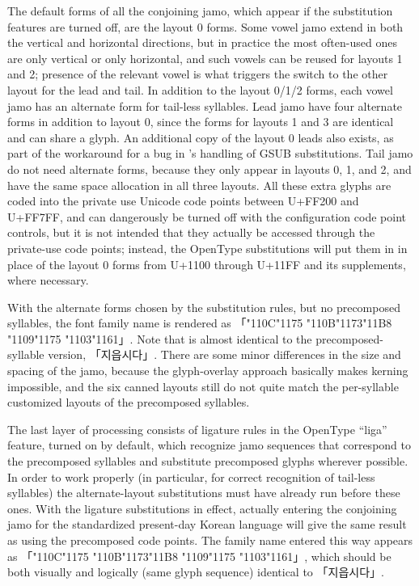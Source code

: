 \documentclass[14pt]{extarticle}
\begin{document}
The default forms of all the conjoining jamo, which appear if the
substitution features are turned off, are the layout 0 forms.  Some vowel
jamo extend in both the vertical and horizontal directions, but in practice
the most often-used ones are only vertical or only horizontal, and such
vowels can be reused for layouts 1 and 2; presence of the relevant vowel is
what triggers the switch to the other layout for the lead and tail.  In
addition to the layout 0/1/2 forms, each vowel jamo has an alternate form
for tail-less syllables.  Lead jamo have four alternate forms in addition to
layout 0, since the forms for layouts 1 and 3 are identical and can share a
glyph.  An additional copy of the layout 0 leads also exists, as part of the
workaround for a bug in \XeTeX's handling of GSUB substitutions.  Tail jamo
do not need alternate forms, because they only appear in layouts 0, 1, and
2, and have the same space allocation in all three layouts.  All these extra
glyphs are coded into the private use Unicode code points between U+FF200
and U+FF7FF, and can dangerously be turned off with the configuration code
point controls, but it is not intended that they actually be accessed
through the private-use code points; instead, the OpenType substitutions
will put them in in place of the layout 0 forms from U+1100 through U+11FF
and its supplements, where necessary.

With the alternate forms chosen by the substitution rules, but no
precomposed syllables, the font
family name is rendered as
{
「\char"110C\char"1175%
\char"110B\char"1173\char"11B8%
\char"1109\char"1175%
\char"1103\char"1161」}.
Note that is almost identical to the
precomposed-syllable version, {\dodum 「지읍시다」}.  There are some minor
differences in the size and spacing of the jamo, because the
glyph-overlay approach basically makes kerning impossible, and the six
canned layouts still do not quite match the per-syllable customized layouts
of the precomposed syllables.

The last layer of processing consists of ligature rules in the OpenType
``liga'' feature, turned on by default, which recognize jamo sequences that
correspond to the precomposed syllables and substitute precomposed glyphs
wherever possible.  In order to work properly (in particular, for correct
recognition of tail-less syllables) the alternate-layout substitutions must
have already run before these ones.  With the ligature substitutions in
effect, actually entering the conjoining jamo for the
standardized present-day Korean language will give the same result as using
the precomposed code points.  The family name entered this way appears as
{\dodum 「\char"110C\char"1175%
\char"110B\char"1173\char"11B8%
\char"1109\char"1175%
\char"1103\char"1161」}, which should be both visually and logically
(same glyph sequence) identical to {\dodum 「지읍시다」}.
\end{document}
